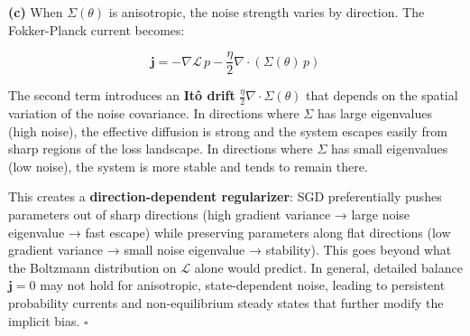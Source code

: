 \documentclass[
]{article}
\begin{document}
\textbf{(c)} When \(\Sigma(\theta)\) is anisotropic, the noise strength
varies by direction. The Fokker-Planck current becomes:

\[\mathbf{j} = -\nabla\mathcal{L}\,p - \frac{\eta}{2}\nabla\cdot(\Sigma(\theta)\,p)\]

The second term introduces an \textbf{Itô drift}
\(\frac{\eta}{2}\nabla\cdot\Sigma(\theta)\) that depends on the spatial
variation of the noise covariance. In directions where \(\Sigma\) has
large eigenvalues (high noise), the effective diffusion is strong and
the system escapes easily from sharp regions of the loss landscape. In
directions where \(\Sigma\) has small eigenvalues (low noise), the
system is more stable and tends to remain there.

This creates a \textbf{direction-dependent regularizer}: SGD
preferentially pushes parameters out of sharp directions (high gradient
variance → large noise eigenvalue → fast escape) while preserving
parameters along flat directions (low gradient variance → small noise
eigenvalue → stability). This goes beyond what the Boltzmann
distribution on \(\mathcal{L}\) alone would predict. In general,
detailed balance \(\mathbf{j} = 0\) may not hold for anisotropic,
state-dependent noise, leading to persistent probability currents and
non-equilibrium steady states that further modify the implicit bias.
\(\square\)
\end{document}
